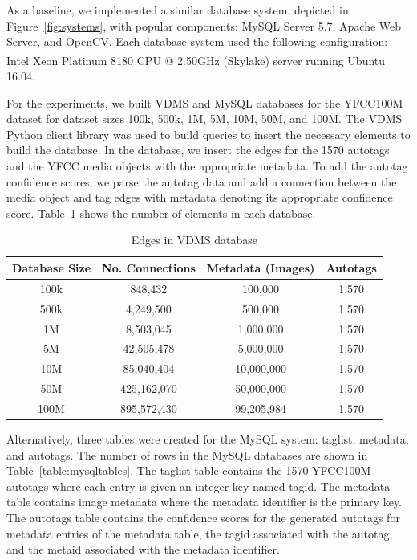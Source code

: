 As a baseline, we implemented a similar database system, depicted in Figure~\ref{fig:systems}, with popular components: MySQL Server 5.7, Apache Web Server, and OpenCV.  Each database system used the following configuration: Intel\textsuperscript{\textregistered} Xeon\textsuperscript{\textregistered} Platinum 8180 CPU @ 2.50GHz (Skylake) server running Ubuntu 16.04.  
 
For the experiments, we built VDMS and MySQL databases for the YFCC100M dataset for dataset sizes 100k, 500k, 1M, 5M, 10M, 50M, and 100M. The VDMS Python client library was used to build queries to insert the necessary elements to build the database.  In the database, we insert the edges for the 1570 autotags and the YFCC media objects with the appropriate metadata. To add the autotag confidence scores, we parse the autotag data and add a connection between the media object and tag edges with metadata denoting its appropriate confidence score. Table~\ref{table:vdmsedges} shows the number of elements in each database.  

\begin{table}[h]
\caption{Edges in VDMS database}
\centering
\begin{tabular}{c c c c}
\hline\hline
Database Size & No. Connections & Metadata (Images) & Autotags\\
\hline
100k & 848,432 & 100,000 & 1,570\\
500k & 4,249,500 & 500,000 & 1,570\\
1M & 8,503,045 & 1,000,000 & 1,570\\
5M & 42,505,478 & 5,000,000 & 1,570\\
10M & 85,040,404 & 10,000,000 & 1,570\\
50M & 425,162,070 & 50,000,000 & 1,570\\
100M & 895,572,430 & 99,205,984 & 1,570\\
\hline
\end{tabular}
\label{table:vdmsedges}
\end{table}

Alternatively, three tables were created for the MySQL system: taglist, metadata, and autotags.  The number of rows in the MySQL databases are shown in Table~\ref{table:mysqltables}. The taglist table contains the 1570 YFCC100M autotags where each entry is given an integer key named tagid.  The metadata table contains image metadata where the metadata identifier is the primary key. The autotags table contains the confidence scores for the generated autotags for metadata entries of the metadata table, the tagid associated with the autotag, and the metaid associated with the metadata identifier. 


